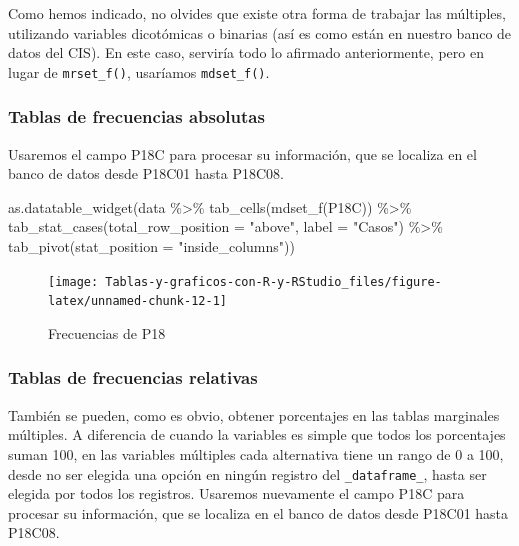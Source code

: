 \documentclass[
]{book}
\newenvironment{Shaded}{\begin{snugshade}}{\end{snugshade}}
\newcommand{\AttributeTok}[1]{\textcolor[rgb]{0.77,0.63,0.00}{#1}}
\newcommand{\FunctionTok}[1]{\textcolor[rgb]{0.00,0.00,0.00}{#1}}
\newcommand{\NormalTok}[1]{#1}
\newcommand{\SpecialCharTok}[1]{\textcolor[rgb]{0.00,0.00,0.00}{#1}}
\newcommand{\StringTok}[1]{\textcolor[rgb]{0.31,0.60,0.02}{#1}}
\begin{document}
Como hemos indicado, no olvides que existe otra forma de trabajar las múltiples, utilizando variables dicotómicas o binarias (así es como están en nuestro banco de datos del CIS). En este caso, serviría todo lo afirmado anteriormente, pero en lugar de \texttt{mrset\_f()}, usaríamos \texttt{mdset\_f()}.

\hypertarget{tablas-de-frecuencias-absolutas}{%
\subsubsection{Tablas de frecuencias absolutas}\label{tablas-de-frecuencias-absolutas}}

Usaremos el campo P18C para procesar su información, que se localiza en el banco de datos desde P18C01 hasta P18C08.

\begin{Shaded}
\begin{Highlighting}[]
\FunctionTok{as.datatable\_widget}\NormalTok{(data }\SpecialCharTok{\%\textgreater{}\%}
  \FunctionTok{tab\_cells}\NormalTok{(}\FunctionTok{mdset\_f}\NormalTok{(P18C)) }\SpecialCharTok{\%\textgreater{}\%}
  \FunctionTok{tab\_stat\_cases}\NormalTok{(}\AttributeTok{total\_row\_position =} \StringTok{"above"}\NormalTok{, }\AttributeTok{label =} \StringTok{"Casos"}\NormalTok{) }\SpecialCharTok{\%\textgreater{}\%}
  \FunctionTok{tab\_pivot}\NormalTok{(}\AttributeTok{stat\_position =} \StringTok{"inside\_columns"}\NormalTok{))}
\end{Highlighting}
\end{Shaded}

\begin{figure}[H]

{\centering \texttt{[image: Tablas-y-graficos-con-R-y-RStudio\_files/figure-latex/unnamed-chunk-12-1]} 

}

\caption{Frecuencias de P18}\label{fig:unnamed-chunk-12}
\end{figure}

\hypertarget{tablas-de-frecuencias-relativas-1}{%
\subsubsection{Tablas de frecuencias relativas}\label{tablas-de-frecuencias-relativas-1}}

También se pueden, como es obvio, obtener porcentajes en las tablas marginales múltiples. A diferencia de cuando la variables es simple que todos los porcentajes suman 100, en las variables múltiples cada alternativa tiene un rango de 0 a 100, desde no ser elegida una opción en ningún registro del \texttt{\_dataframe\_}, hasta ser elegida por todos los registros. Usaremos nuevamente el campo P18C para procesar su información, que se localiza en el banco de datos desde P18C01 hasta P18C08.
\end{document}
